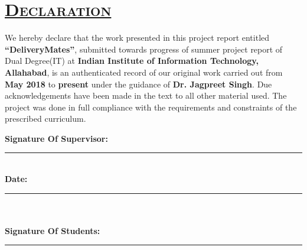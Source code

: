 \documentclass{report}
\begin{document}

{\chapter*{ \quad \quad \quad \quad \quad \quad  \Huge \scshape \underline {Declaration} }
\vspace{2.0cm}
\begin{spacing}{0.3}
\fontsize{17}{68}\selectfont\linespread{10} {We hereby declare that the work presented in this project report entitled \textbf{``DeliveryMates''},  submitted towards progress of summer project report of Dual Degree(IT) at \textbf{Indian Institute of Information Technology, Allahabad}, is an authenticated record of our original work carried out from \textbf{May 2018} to \textbf{present} under the guidance of \textbf{Dr. Jagpreet Singh}. Due acknowledgements have been made in the text to all other material used. The project was done in full compliance with the requirements and constraints of the prescribed curriculum.}
\end{spacing}
\vspace{5cm}
\Large
\noindent \textbf{Signature Of Supervisor:}\\
\rule[0.5em]{25em}{0.5pt} %
\vspace{1cm}\\
\noindent \textbf{Date:}\\
\rule[0.5em]{25em}{0.5pt}\\ %
\vspace{1cm}\\
\noindent \textbf{Signature Of Students:}\\
\rule[0.5em]{12em}{0.5pt} %
\vspace{1.5cm}\\

}



{ \doublespacing
{}
\tableofcontents %

\pagebreak
\listoffigures %
\pagebreak
\listoftables %
\pagebreak

}
\end{document}

